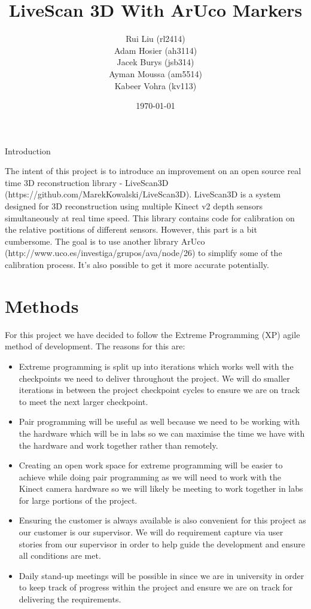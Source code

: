 \documentclass[a4paper,12pt]{article}
\title{LiveScan 3D With ArUco Markers}
\author{Rui Liu (rl2414)\\Adam Hosier (ah3114)\\Jacek Burys (jsb314)\\Ayman Moussa (am5514)\\Kabeer Vohra (kv113)}
\date{\today}
\begin{document}
\maketitle
Introduction

The intent of this project is to introduce an improvement on an open source real time 3D reconstruction library - LiveScan3D (https://github.com/MarekKowalski/LiveScan3D).
LiveScan3D is a system designed for 3D reconstruction using multiple Kinect v2 depth sensors simultaneously at real time speed.
This library contains code for calibration on the relative postitions of different sensors. However, this part is a bit cumbersome.
The goal is to use another library ArUco (http://www.uco.es/investiga/grupos/ava/node/26) to simplify some of the calibration process. It's also possible to get it more accurate potentially.

\section*{Methods}
For this project we have decided to follow the Extreme Programming (XP) agile method of development. The reasons for this are:

\begin{itemize}
\item Extreme programming is split up into iterations which works well with the checkpoints we need to deliver throughout the project. We will do smaller iterations in between the project checkpoint cycles to ensure we are on track to meet the next larger checkpoint.
\item Pair programming will be useful as well because we need to be working with the hardware which will be in labs so we can maximise the time we have with the hardware and work together rather than remotely.
\item Creating an open work space for extreme programming will be easier to achieve while doing pair programming as we will need to work with the Kinect camera hardware so we will likely be meeting to work together in labs for large portions of the project.
\item Ensuring the customer is always available is also convenient for this project as our customer is our supervisor. We will do requirement capture via user stories from our supervisor in order to help guide the development and ensure all conditions are met.
\item Daily stand-up meetings will be possible in since we are in university in order to keep track of progress within the project and ensure we are on track for delivering the requirements.
\end{itemize}
\end{document}
